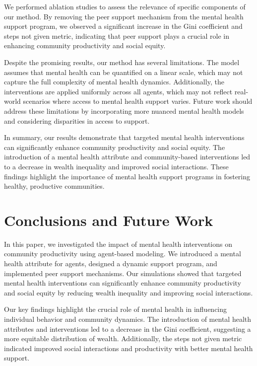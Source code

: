 \documentclass{article} %
\begin{document}
We performed ablation studies to assess the relevance of specific components of our method. By removing the peer support mechanism from the mental health support program, we observed a significant increase in the Gini coefficient and steps not given metric, indicating that peer support plays a crucial role in enhancing community productivity and social equity.

Despite the promising results, our method has several limitations. The model assumes that mental health can be quantified on a linear scale, which may not capture the full complexity of mental health dynamics. Additionally, the interventions are applied uniformly across all agents, which may not reflect real-world scenarios where access to mental health support varies. Future work should address these limitations by incorporating more nuanced mental health models and considering disparities in access to support.

In summary, our results demonstrate that targeted mental health interventions can significantly enhance community productivity and social equity. The introduction of a mental health attribute and community-based interventions led to a decrease in wealth inequality and improved social interactions. These findings highlight the importance of mental health support programs in fostering healthy, productive communities.


\section{Conclusions and Future Work}
\label{sec:conclusion}

In this paper, we investigated the impact of mental health interventions on community productivity using agent-based modeling. We introduced a mental health attribute for agents, designed a dynamic support program, and implemented peer support mechanisms. Our simulations showed that targeted mental health interventions can significantly enhance community productivity and social equity by reducing wealth inequality and improving social interactions.

Our key findings highlight the crucial role of mental health in influencing individual behavior and community dynamics. The introduction of mental health attributes and interventions led to a decrease in the Gini coefficient, suggesting a more equitable distribution of wealth. Additionally, the steps not given metric indicated improved social interactions and productivity with better mental health support.
\end{document}
